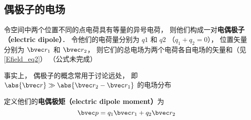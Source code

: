 


\subsection{偶极子的电场}

令空间中两个位置不同的点电荷具有等量的异号电荷， 则他们构成一对\textbf{电偶极子（electric dipole）}． 令他们的电荷量分别为 $q1$ 和 $q2$ （$q_1 + q_2 = 0$）， 位置矢量分别为 $\bvec r_1$ 和 $\bvec r_2$， 则它们的总电场为两个电荷各自电场的矢量和（见\autoref{Efield_eq2}）
（公式未完成）

事实上， 偶极子的概念常用于讨论远处， 即 $\abs{\bvec r} \gg \abs{\bvec r_2 - \bvec r_1}$ 的电场分布

定义他们的\textbf{电偶极矩（electric dipole moment）}为
\begin{equation}
\bvec p = q_1 \bvec r_1 + q_2 \bvec r_2
\end{equation}
